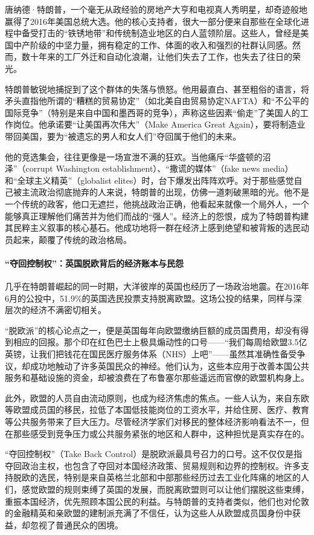 唐纳德·特朗普，一个毫无从政经验的房地产大亨和电视真人秀明星，却奇迹般地赢得了2016年美国总统大选。他的核心支持者，很大一部分便来自那些在全球化进程中备受打击的“铁锈地带”和传统制造业地区的白人蓝领阶层。这些人，曾经是美国中产阶级的中坚力量，拥有稳定的工作、体面的收入和强烈的社群认同感。然而，数十年来的工厂外迁和自动化浪潮，让他们失去了工作，也失去了往日的荣光。

特朗普敏锐地捕捉到了这个群体的失落与愤怒。他用最直白、甚至粗俗的语言，将矛头直指他所谓的“糟糕的贸易协定”（如北美自由贸易协定NAFTA）和“不公平的国际竞争”（特别是来自中国和墨西哥的竞争），声称这些因素“偷走”了美国人的工作岗位。他承诺要“让美国再次伟大”（Make America Great Again），要将制造业带回美国，要为“被遗忘的男人和女人们”夺回属于他们的未来。

他的竞选集会，往往更像是一场宣泄不满的狂欢。当他痛斥“华盛顿的沼泽”（corrupt Washington establishment）、“撒谎的媒体”（fake news media）和“全球主义精英”（globalist elites）时，台下爆发出阵阵欢呼。对于那些感觉自己被主流政治彻底抛弃的人来说，特朗普的出现，仿佛一道刺破黑暗的光。他不是一个传统的政客，他口无遮拦，他挑战政治正确，他看起来就像一个局外人，一个能够真正理解他们痛苦并为他们而战的“强人”。经济上的怨恨，成为了特朗普构建其民粹主义叙事的核心基石。他成功地将一群在经济上感到绝望和被背叛的选民动员起来，颠覆了传统的政治格局。

\paragraph*{“夺回控制权”：英国脱欧背后的经济账本与民怨}

几乎在特朗普崛起的同一时期，大洋彼岸的英国也经历了一场政治地震。在2016年6月的公投中，51.9\%的英国选民投票支持脱离欧盟。这场公投的结果，同样与深层次的经济不满密切相关。

“脱欧派”的核心论点之一，便是英国每年向欧盟缴纳巨额的成员国费用，却没有得到相应的回报。那个印在红色巴士上极具煽动性的口号——“我们每周给欧盟3.5亿英镑，让我们把钱花在国民医疗服务体系（NHS）上吧”——虽然其准确性备受争议，却成功地触动了许多英国民众的神经。他们认为，这些本应用于改善本国公共服务和基础设施的资金，却被浪费在了布鲁塞尔那些遥远而官僚的欧盟机构身上。

此外，欧盟的人员自由流动原则，也成为经济焦虑的焦点。一些人认为，来自东欧等欧盟成员国的移民，拉低了本国低技能岗位的工资水平，并给住房、医疗、教育等公共服务带来了巨大压力。尽管经济学家们对移民的整体经济影响看法不一，但在那些感受到竞争压力或公共服务紧张的地区和人群中，这种担忧是真实存在的。

“夺回控制权”（Take Back Control）是脱欧派最具号召力的口号。这不仅仅是指夺回政治主权，也包含了夺回对本国经济政策、贸易规则和边界的控制权。许多支持脱欧的选民，特别是来自英格兰北部和中部那些经历过去工业化阵痛的地区的人们，感觉欧盟的规则束缚了英国的发展，而脱离欧盟则可以让他们摆脱这些束缚，重振本国经济，优先照顾本国公民的利益。与特朗普的支持者类似，他们也对伦敦的金融精英和亲欧盟的建制派充满了不信任，认为这些人从欧盟成员国身份中获益，却忽视了普通民众的困境。

